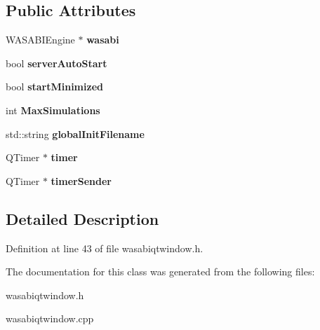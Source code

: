 \subsection*{\-Public \-Attributes}
\begin{DoxyCompactItemize}
\item 
\hypertarget{class_w_a_s_a_b_i_qt_window_ac35382ea2bf1bd03494b9f37179c65f1}{
\-W\-A\-S\-A\-B\-I\-Engine $\ast$ {\bfseries wasabi}}
\label{class_w_a_s_a_b_i_qt_window_ac35382ea2bf1bd03494b9f37179c65f1}

\item 
\hypertarget{class_w_a_s_a_b_i_qt_window_a64a2bbf9a9764e6f50b95ee7e30f7aa1}{
bool {\bfseries server\-Auto\-Start}}
\label{class_w_a_s_a_b_i_qt_window_a64a2bbf9a9764e6f50b95ee7e30f7aa1}

\item 
\hypertarget{class_w_a_s_a_b_i_qt_window_a5bb82f3e66d4fa23c81d288c6fbe8d49}{
bool {\bfseries start\-Minimized}}
\label{class_w_a_s_a_b_i_qt_window_a5bb82f3e66d4fa23c81d288c6fbe8d49}

\item 
\hypertarget{class_w_a_s_a_b_i_qt_window_a194affd348309434892e80404eaef75c}{
int {\bfseries \-Max\-Simulations}}
\label{class_w_a_s_a_b_i_qt_window_a194affd348309434892e80404eaef75c}

\item 
\hypertarget{class_w_a_s_a_b_i_qt_window_ad2f768df5a2b0b958096b9e3f8156b7f}{
std\-::string {\bfseries global\-Init\-Filename}}
\label{class_w_a_s_a_b_i_qt_window_ad2f768df5a2b0b958096b9e3f8156b7f}

\item 
\hypertarget{class_w_a_s_a_b_i_qt_window_a07fd5ee767235ae3b21cd580c4a97b94}{
\-Q\-Timer $\ast$ {\bfseries timer}}
\label{class_w_a_s_a_b_i_qt_window_a07fd5ee767235ae3b21cd580c4a97b94}

\item 
\hypertarget{class_w_a_s_a_b_i_qt_window_a1a69b535afd5f998d7a62a10c7ca50c2}{
\-Q\-Timer $\ast$ {\bfseries timer\-Sender}}
\label{class_w_a_s_a_b_i_qt_window_a1a69b535afd5f998d7a62a10c7ca50c2}

\end{DoxyCompactItemize}


\subsection{\-Detailed \-Description}


\-Definition at line 43 of file wasabiqtwindow.\-h.



\-The documentation for this class was generated from the following files\-:\begin{DoxyCompactItemize}
\item 
wasabiqtwindow.\-h\item 
wasabiqtwindow.\-cpp\end{DoxyCompactItemize}
